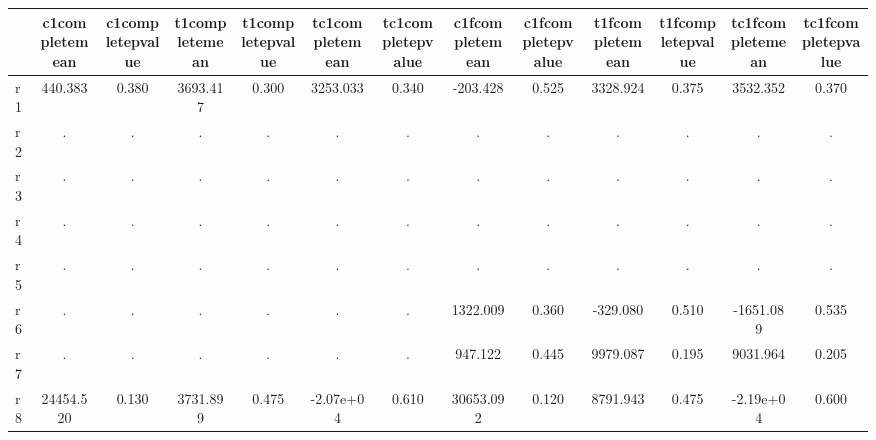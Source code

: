 \begin{table}[htbp]
\begin{tabular}{lcccccccccccc} \hline \hline
 & c1completemean  & c1completepvalue  & t1completemean  & t1completepvalue  & tc1completemean  & tc1completepvalue  & c1fcompletemean  & c1fcompletepvalue  & t1fcompletemean  & t1fcompletepvalue  & tc1fcompletemean  & tc1fcompletepvalue  \\  \hline 
r1 &   440.383 &     0.380 &  3693.417 &     0.300 &  3253.033 &     0.340 &  -203.428 &     0.525 &  3328.924 &     0.375 &  3532.352 &     0.370 \\  
r2 &         . &         . &         . &         . &         . &         . &         . &         . &         . &         . &         . &         . \\  
r3 &         . &         . &         . &         . &         . &         . &         . &         . &         . &         . &         . &         . \\  
r4 &         . &         . &         . &         . &         . &         . &         . &         . &         . &         . &         . &         . \\  
r5 &         . &         . &         . &         . &         . &         . &         . &         . &         . &         . &         . &         . \\  
r6 &         . &         . &         . &         . &         . &         . &  1322.009 &     0.360 &  -329.080 &     0.510 & -1651.089 &     0.535 \\  
r7 &         . &         . &         . &         . &         . &         . &   947.122 &     0.445 &  9979.087 &     0.195 &  9031.964 &     0.205 \\  
r8 & 24454.520 &     0.130 &  3731.899 &     0.475 & -2.07e+04 &     0.610 & 30653.092 &     0.120 &  8791.943 &     0.475 & -2.19e+04 &     0.600 \\  
\hline \hline \end{tabular}
\end{table}
